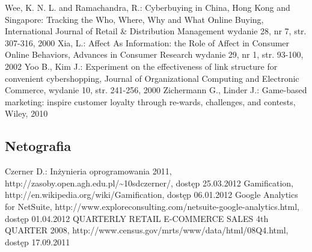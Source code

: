 {\begin{thebibliography}{40}
     Wee, K. N. L. and Ramachandra, R.: Cyberbuying in China, Hong Kong and Singapore: Tracking the Who, Where, Why and What Online Buying, International Journal of Retail \& Distribution Management wydanie 28, nr 7, str. 307-316, 2000
     Xia, L.: Affect As Information: the Role of Affect in Consumer Online Behaviors, Advances in Consumer Research wydanie 29, nr 1, str. 93-100, 2002
     Yoo B., Kim J.: Experiment on the effectiveness of link structure for convenient cybershopping, Journal of Organizational Computing and Electronic Commerce, wydanie 10, str. 241-256, 2000
     Zichermann G., Linder J.: Game-based marketing: inspire customer loyalty through re-wards, challenges, and contests, Wiley, 2010

  \end{thebibliography}
  \renewcommand*{\refname}{}
  \subsection{Netografia}
  \vspace{-40pt}
  \begin{thebibliography}{5}
     {Czerner D.: Inżynieria oprogramowania 2011, 
    http://zasoby.open.agh.edu.pl/\textasciitilde10sdczerner/, dostęp 25.03.2012}
     {Gamification, http://en.wikipedia.org/wiki/Gamification, 
    dostęp 06.01.2012}
     {Google Analytics for NetSuite, 
    http://www.exploreconsulting.com/netsuite-google-analytics.html, dostęp 01.04.2012}
     {QUARTERLY RETAIL E-COMMERCE SALES 4th QUARTER 2008, 
    http://www.census.gov/mrts/www/data/html/08Q4.html, dostęp 17.09.2011}

  \end{thebibliography}
  \newpage
}

